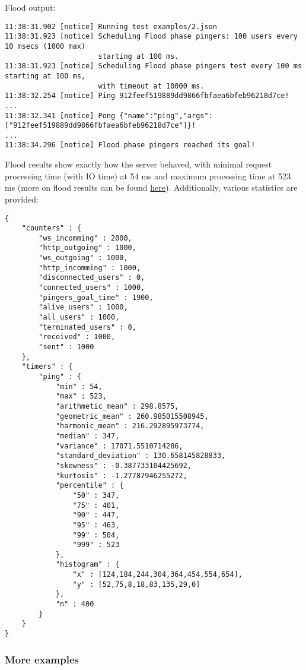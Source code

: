 \documentclass[a4paper]{article}
\begin{document}
\noindent
Flood output:


\begin{verbatim}
11:38:31.902 [notice] Running test examples/2.json
11:38:31.923 [notice] Scheduling Flood phase pingers: 100 users every 10 msecs (1000 max)
                      starting at 100 ms.
11:38:31.923 [notice] Scheduling Flood phase pingers test every 100 ms starting at 100 ms,
                      with timeout at 10000 ms.
11:38:32.254 [notice] Ping 912feef519889dd9866fbfaea6bfeb96218d7ce!
...
11:38:32.341 [notice] Pong {"name":"ping","args":["912feef519889dd9866fbfaea6bfeb96218d7ce"]}!
...
11:38:34.296 [notice] Flood phase pingers reached its goal!
\end{verbatim}



\noindent
Flood results show exactly how the server behaved, with minimal request processing time (with IO time) at 54 ms and maximum processing time at 523 ms (more on flood results can be found \hyperref[sec-4]{here}). Additionally, various statistics are provided:


\begin{verbatim}
{
    "counters" : {
        "ws_incomming" : 2000,
        "http_outgoing" : 1000,
        "ws_outgoing" : 1000,
        "http_incomming" : 1000,
        "disconnected_users" : 0,
        "connected_users" : 1000,
        "pingers_goal_time" : 1900,
        "alive_users" : 1000,
        "all_users" : 1000,
        "terminated_users" : 0,
        "received" : 1000,
        "sent" : 1000
    },
    "timers" : {
        "ping" : {
            "min" : 54,
            "max" : 523,
            "arithmetic_mean" : 298.8575,
            "geometric_mean" : 260.985015508945,
            "harmonic_mean" : 216.292895973774,
            "median" : 347,
            "variance" : 17071.5510714286,
            "standard_deviation" : 130.658145828833,
            "skewness" : -0.387733104425692,
            "kurtosis" : -1.27787946255272,
            "percentile" : {
                "50" : 347,
                "75" : 401,
                "90" : 447,
                "95" : 463,
                "99" : 504,
                "999" : 523
            },
            "histogram" : {
                "x" : [124,184,244,304,364,454,554,654],
                "y" : [52,75,8,18,83,135,29,0]
            },
            "n" : 400
        }
    }
}
\end{verbatim}
\subsubsection{More examples}
\label{sec-3-7-3}
\end{document}
